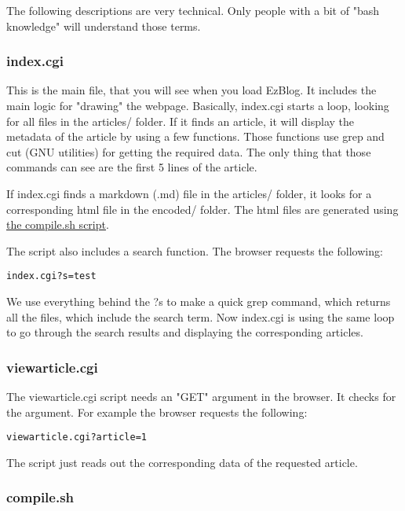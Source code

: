 \documentclass[12pt,a4paper]{article}
\begin{document}
The following descriptions are very technical. Only people with a bit of "bash knowledge" will understand those terms.

\subsubsection{index.cgi}
\label{sec:index.cgi}

This is the main file, that you will see when you load EzBlog. It includes the main logic for "drawing" the webpage. Basically, index.cgi starts a loop, looking for all files in the articles/ folder. If it finds an article, it will display the metadata of the article by using a few functions. Those functions use grep and cut (GNU utilities) for getting the required data. The only thing that those commands can see are the first 5 lines of the article.

If index.cgi finds a markdown (.md) file in the articles/ folder, it looks for a corresponding html file in the encoded/ folder. The html files are generated using \hyperref[sec:compile.sh]{the compile.sh script}.

The script also includes a search function. The browser requests the following:
\begin{lstlisting}
index.cgi?s=test
\end{lstlisting}

We use everything behind the ?s to make a quick grep command, which returns all the files, which include the search term. Now index.cgi is using the same loop to go through the search results and displaying the corresponding articles.

\subsubsection{viewarticle.cgi}
\label{sec:viewarticle.cgi}

The viewarticle.cgi script needs an "GET" argument in the browser. It checks for the argument. For example the browser requests the following: 
\begin{lstlisting}
viewarticle.cgi?article=1 
\end{lstlisting}

The script just reads out the corresponding data of the requested article. 

\subsubsection{compile.sh}
\label{sec:compile.sh}
\end{document}

